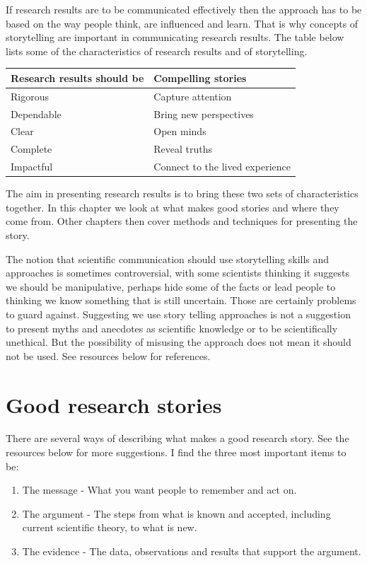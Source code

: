 \documentclass[
]{book}
\begin{document}
If research results are to be communicated effectively then the approach has to be based on the way people think, are influenced and learn. That is why concepts of storytelling are important in communicating research results. The table below lists some of the characteristics of research results and of storytelling.

\begin{longtable}[]{@{}ll@{}}
\toprule
Research results should be & Compelling stories \\
\midrule
\endhead
Rigorous & Capture attention \\
Dependable & Bring new perspectives \\
Clear & Open minds \\
Complete & Reveal truths \\
Impactful & Connect to the lived experience \\
\bottomrule
\end{longtable}

The aim in presenting research results is to bring these two sets of characteristics together. In this chapter we look at what makes good stories and where they come from. Other chapters then cover methods and techniques for presenting the story.

The notion that scientific communication should use storytelling skills and approaches is sometimes controversial, with some scientists thinking it suggests we should be manipulative, perhaps hide some of the facts or lead people to thinking we know something that is still uncertain. Those are certainly problems to guard against. Suggesting we use story telling approaches is not a suggestion to present myths and anecdotes as scientific knowledge or to be scientifically unethical. But the possibility of misusing the approach does not mean it should not be used. See resources below for references.

\hypertarget{good-research-stories}{%
\section{Good research stories}\label{good-research-stories}}

There are several ways of describing what makes a good research story. See the resources below for more suggestions. I find the three most important items to be:

\begin{enumerate}
\def\labelenumi{\arabic{enumi}.}
\item
  The message - What you want people to remember and act on.
\item
  The argument - The steps from what is known and accepted, including current scientific theory, to what is new.
\item
  The evidence - The data, observations and results that support the argument.
\end{enumerate}
\end{document}
